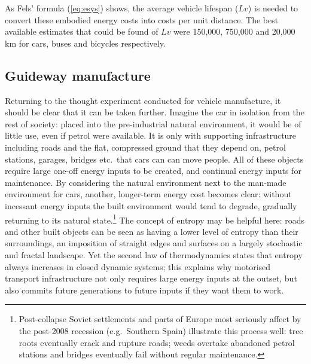 As Fels' formula (\cref{eq:esys}) shows, the average vehicle lifespan
($Lv$) is
needed to convert these embodied energy costs into costs per unit distance.
The best available estimates that could be found of 
$Lv$ were 150,000, 750,000 and 20,000 km for cars, buses and bicycles
respectively.


\subsection{Guideway manufacture} 
Returning to the thought experiment conducted for vehicle manufacture, it
should be clear that it can be taken further. Imagine the car in isolation
from the rest of society: placed into the pre-industrial natural environment,
it would be of little use, even if petrol were available.
It is only with supporting infrastructure including roads and the flat,
compressed ground that they depend on, petrol stations, garages, bridges
etc.~that cars can can move people. All of these objects require large one-off
energy inputs to be created, and continual energy inputs for maintenance. By
considering the natural environment next to the
man-made environment for cars, another, longer-term energy cost becomes clear:
without incessant energy inputs the built environment would tend to degrade,
gradually returning to its natural
state.\footnote{Post-collapse Soviet settlements
and parts of Europe most seriously affect by the post-2008 recession
(e.g.~Southern Spain)
illustrate this process well: tree roots eventually crack and rupture roads;
weeds overtake abandoned petrol stations and bridges eventually fail without
regular maintenance.
}
The concept of entropy may be helpful here: roads and other built objects
can be seen as having a lower level of entropy than their surroundings, an
imposition of straight edges and surfaces on a largely stochastic and fractal
landscape. Yet the second law of thermodynamics states that entropy always
increases in closed dynamic systems; this explains why motorised transport
infrastructure not only requires large energy inputs at the outset, but also
commits future generations to future inputs if they want them to work.

